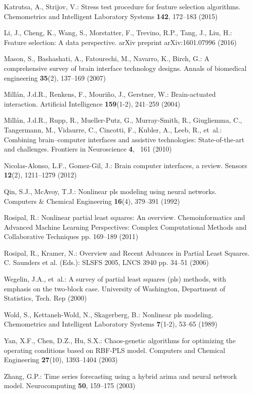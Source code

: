 \documentclass[runningheads]{llncs}
\begin{document}
\begin{thebibliography}{8}
Katrutsa, A., Strijov, V.: Stress test procedure for feature selection
  algorithms. Chemometrics and Intelligent Laboratory Systems  \textbf{142},
  172--183 (2015)

Li, J., Cheng, K., Wang, S., Morstatter, F., Trevino, R.P., Tang, J., Liu, H.:
  Feature selection: A data perspective. arXiv preprint arXiv:1601.07996
  (2016)

Mason, S., Bashashati, A., Fatourechi, M., Navarro, K., Birch, G.: A
  comprehensive survey of brain interface technology designs. Annals of
  biomedical engineering  \textbf{35}(2),  137--169 (2007)

Mill{\'a}n, J.d.R., Renkens, F., Mouri{\~n}o, J., Gerstner, W.: Brain-actuated
  interaction. Artificial Intelligence  \textbf{159}(1-2),  241--259 (2004)

Mill{\'a}n, J.d.R., Rupp, R., Mueller-Putz, G., Murray-Smith, R., Giugliemma,
  C., Tangermann, M., Vidaurre, C., Cincotti, F., Kubler, A., Leeb, R., et~al.:
  Combining brain--computer interfaces and assistive technologies:
  State-of-the-art and challenges. Frontiers in Neuroscience  \textbf{4}, ~161
  (2010)

Nicolas-Alonso, L.F., Gomez-Gil, J.: Brain computer interfaces, a review.
  Sensors  \textbf{12}(2),  1211--1279 (2012)

Qin, S.J., McAvoy, T.J.: Nonlinear pls modeling using neural networks.
  Computers \& Chemical Engineering  \textbf{16}(4),  379--391 (1992)

Rosipal, R.: {Nonlinear partial least squares: An overview}. Chemoinformatics
  and Advanced Machine Learning Perspectives: Complex Computational Methods and
  Collaborative Techniques pp. 169--189 (2011)

Rosipal, R., Kramer, N.: {Overview and Recent Advances in Partial Least
  Squares}. C. Saunders et al. (Eds.): SLSFS 2005, LNCS 3940 pp. 34--51 (2006)

Wegelin, J.A., et~al.: A survey of partial least squares (pls) methods, with
  emphasis on the two-block case. University of Washington, Department of
  Statistics, Tech. Rep  (2000)

Wold, S., Kettaneh-Wold, N., Skagerberg, B.: Nonlinear pls modeling.
  Chemometrics and Intelligent Laboratory Systems  \textbf{7}(1-2),  53--65
  (1989)

Yan, X.F., Chen, D.Z., Hu, S.X.: {Chaos-genetic algorithms for optimizing the
  operating conditions based on RBF-PLS model}. Computers and Chemical
  Engineering  \textbf{27}(10),  1393--1404 (2003)

Zhang, G.P.: Time series forecasting using a hybrid arima and neural network
  model. Neurocomputing  \textbf{50},  159--175 (2003)
\end{thebibliography}
\end{document}
